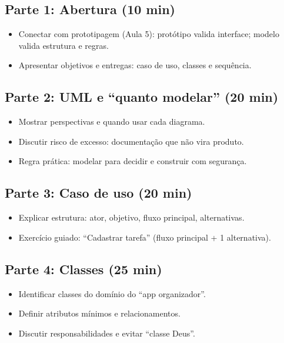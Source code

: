 \documentclass[12pt,a4paper]{article}
\begin{document}
\subsection*{Parte 1: Abertura (10 min)}
\begin{itemize}[leftmargin=*,itemsep=0.35em]
  \item Conectar com prototipagem (Aula 5): protótipo valida interface; modelo valida estrutura e regras.
  \item Apresentar objetivos e entregas: caso de uso, classes e sequência.
\end{itemize}

\subsection*{Parte 2: UML e ``quanto modelar'' (20 min)}
\begin{itemize}[leftmargin=*,itemsep=0.35em]
  \item Mostrar perspectivas e quando usar cada diagrama.
  \item Discutir risco de excesso: documentação que não vira produto.
  \item Regra prática: modelar para decidir e construir com segurança.
\end{itemize}

\subsection*{Parte 3: Caso de uso (20 min)}
\begin{itemize}[leftmargin=*,itemsep=0.35em]
  \item Explicar estrutura: ator, objetivo, fluxo principal, alternativas.
  \item Exercício guiado: ``Cadastrar tarefa'' (fluxo principal + 1 alternativa).
\end{itemize}

\subsection*{Parte 4: Classes (25 min)}
\begin{itemize}[leftmargin=*,itemsep=0.35em]
  \item Identificar classes do domínio do ``app organizador''.
  \item Definir atributos mínimos e relacionamentos.
  \item Discutir responsabilidades e evitar ``classe Deus''.
\end{itemize}
\end{document}
